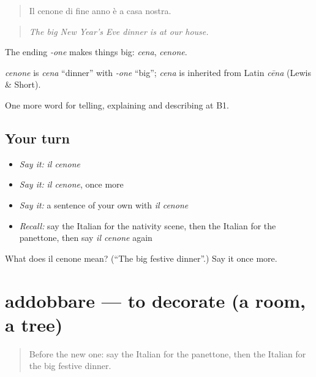 \begin{quote}
Il cenone di fine anno è a casa nostra.
\end{quote}

\begin{quote}
\emph{The big New Year's Eve dinner is at our house.}
\end{quote}

The ending \emph{-one} makes things big: \emph{cena}, \emph{cenone}.

\begin{cousinweb}
\emph{cenone} is \emph{cena} \textquotedblleft{}dinner\textquotedblright{} with \emph{-one} \textquotedblleft{}big\textquotedblright{}; \emph{cena} is inherited from Latin \emph{cēna} (Lewis \& Short).
\end{cousinweb}

\begin{grammarlens}[title={What you've built}]
One more word for telling, explaining and describing at B1.
\end{grammarlens}

\subsection*{Your turn}
\begin{itemize}
\raggedright
  \item \emph{Say it:} \emph{il cenone}
  \item \emph{Say it:} \emph{il cenone}, once more
  \item \emph{Say it:} a sentence of your own with \emph{il cenone}
  \item \emph{Recall:} say the Italian for the nativity scene, then the Italian for the panettone, then say \emph{il cenone} again
\end{itemize}

\begin{tcolorbox}[breakable,colback=teal!4,colframe=teal!35!black,title={Before you move on}]
What does il cenone mean? (\textquotedblleft{}The big festive dinner\textquotedblright{}.) Say it once more.
\end{tcolorbox}
\section[addobbare]{addobbare — to decorate (a room, a tree)}

\label{lesson:IT-C321-addobbare}



\begin{quote}
Before the new one: say the Italian for the panettone, then the Italian for the big festive dinner.
\end{quote}

